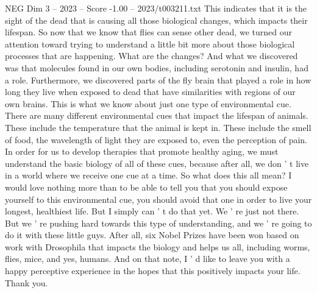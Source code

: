 \begin{textsample}{NEG Dim 3 – 2023 – Score -1.00 – 2023/t003211.txt}
This indicates that it is the sight of the dead that is causing all those biological changes, which impacts their lifespan.
So now that we know that flies can sense other dead, we turned our attention toward trying to understand a little bit more about those biological processes that are happening.
What are the changes?
And what we discovered was that molecules found in our own bodies, including serotonin and insulin, had a role.
Furthermore, we discovered parts of the fly brain that played a role in how long they live when exposed to dead that have similarities with regions of our own brains.
This is what we know about just one type of environmental cue.
There are many different environmental cues that impact the lifespan of animals.
These include the temperature that the animal is kept in.
These include the smell of food, the wavelength of light they are exposed to, even the perception of pain.
In order for us to develop therapies that promote healthy aging, we must understand the basic biology of all of these cues, because after all, we don ' t live in a world where we receive one cue at a time.
So what does this all mean?
I would love nothing more than to be able to tell you that you should expose yourself to this environmental cue, you should avoid that one in order to live your longest, healthiest life.
But I simply can ' t do that yet.
We ' re just not there.
But we ' re pushing hard towards this type of understanding, and we ' re going to do it with these little guys.
After all, six Nobel Prizes have been won based on work with Drosophila that impacts the biology and helps us all, including worms, flies, mice, and yes, humans.
And on that note, I ' d like to leave you with a happy perceptive experience in the hopes that this positively impacts your life.
Thank you.

\end{textsample}
